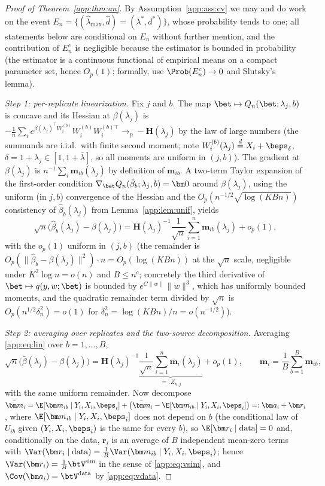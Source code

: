 \begin{proof}[Proof of Theorem~\ref{app:thm:an}]
By Assumption~\ref{app:ass:cv} we may and do work on the event
$E_n=\{(\hat\lambda_{\max},\hat d)=(\lambda^*,d^*)\}$, whose probability
tends to one; all statements below are conditional on $E_n$ without
further mention, and the contribution of $E_n^c$ is negligible because
the estimator is bounded in probability (the estimator is a continuous
functional of empirical means on a compact parameter set, hence
$O_p(1)$; formally, use $\Prob(E_n^c)\to 0$ and Slutsky's lemma).

\emph{Step 1: per-replicate linearization.} Fix $j$ and $b$. The map
$\bet\mapsto Q_n(\bet;\lambda_j,b)$ is concave and its Hessian at
$\beta(\lambda_j)$ is
$-\frac1n\sum_i e^{\beta(\lambda_j)^\top W_i^{(b)}}W_i^{(b)}
W_i^{(b)\top}\to_p -\bm H(\lambda_j)$
by the law of large numbers (the summands are i.i.d.\ with finite second
moment; note $W_i^{(b)}(\lambda_j)\stackrel{d}{=}X_i+\beps_\delta$,
$\delta=1+\lambda_j\in[1,1+\bar\lambda]$, so all moments are uniform in
$(j,b)$). The gradient at $\beta(\lambda_j)$ is
$n^{-1}\sum_i\bm m_{ib}(\lambda_j)$ by definition of
$\bm m_{ib}$. A two-term Taylor expansion of the first-order condition
$\nabla_{\bet} Q_n(\hat\beta_b;\lambda_j,b)=\bm 0$ around
$\beta(\lambda_j)$, using the uniform (in $j,b$) convergence of the
Hessian and the $O_p(n^{-1/2}\sqrt{\log(KBn)})$ consistency of
$\hat\beta_b(\lambda_j)$ from Lemma~\ref{app:lem:unif}, yields
\begin{equation}\label{app:eq:lin}
  \sqrt n\bigl(\hat\beta_b(\lambda_j)-\beta(\lambda_j)\bigr)
  =\bm H(\lambda_j)^{-1}\frac{1}{\sqrt n}\sum_{i=1}^n
   \bm m_{ib}(\lambda_j)+o_p(1),
\end{equation}
with the $o_p(1)$ uniform in $(j,b)$ (the remainder is
$O_p(\|\hat\beta_b-\beta(\lambda_j)\|^2)\cdot n
=O_p(\log(KBn))$ at the $\sqrt n$ scale, negligible under
$K^2\log n=o(n)$ and $B\le n^c$; concretely the third derivative of
$\bet\mapsto q(y,w;\bet)$ is bounded by
$e^{C\|w\|}\|w\|^3$, which has uniformly bounded moments, and the
quadratic remainder term divided by $\sqrt n$ is
$O_p(n^{1/2}\delta_n^2)=o(1)$ for
$\delta_n^2=\log(KBn)/n=o(n^{-1/2})$).

\emph{Step 2: averaging over replicates and the two-source
decomposition.} Averaging \eqref{app:eq:lin} over $b=1,\dots,B$,
\[
  \sqrt n\bigl(\bar\beta(\lambda_j)-\beta(\lambda_j)\bigr)
  =\bm H(\lambda_j)^{-1}
   \underbrace{\frac{1}{\sqrt n}\sum_{i=1}^n
   \bar{\bm m}_i(\lambda_j)}_{=:Z_{n,j}}
   +o_p(1),
   \qquad
   \bar{\bm m}_i=\frac1B\sum_{b=1}^B\bm m_{ib},
\]
with the same uniform remainder. Now decompose
$\bar{\bm m}_i=\E[\bm m_{ib}\mid Y_i,X_i,\beps_i]
+\bigl(\bar{\bm m}_i-\E[\bm m_{ib}\mid Y_i,X_i,\beps_i]\bigr)
=:\bm a_i+\bm r_i$,
where $\E[\bm m_{ib}\mid Y_i,X_i,\beps_i]$ does not depend on $b$ (the
conditional law of $U_{ib}$ given $(Y_i,X_i,\beps_i)$ is the same for
every $b$), so $\E[\bm r_i\mid \text{data}]=0$ and, conditionally on the
data, $\bm r_i$ is an average of $B$ independent mean-zero terms with
$\Var(\bm r_i\mid\text{data})=\frac1B\Var(\bm m_{ib}\mid
Y_i,X_i,\beps_i)$; hence
$\Var(\bm r_i)=\frac1B\btV^{\mathrm{sim}}$ in the sense of
\eqref{app:eq:vsim}, and $\Cov(\bm a_i)=\btV^{\mathrm{data}}$ by
\eqref{app:eq:vdata}.


\end{proof}
